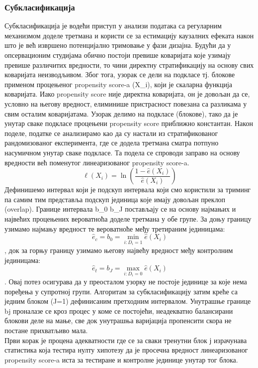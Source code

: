 \documentclass[12pt, a4paper]{article}
\begin{document}
\subsubsection{Субкласификација}
Субкласификација је водећи приступ у анализи података са регуларним механизмом доделе третмана и користи се за естимацију каузалних ефеката након што је већ извршено потенцијално тримовање у фази дизајна. 
Будући да у опсервационим студијама обично постоји превише коваријата које узимају превише различитих вредности, то чини директну стратификацију на основу свих коваријата неизводљивом. Због тога, узорак се дели на подкласе тј. блокове применом процењеног propensity score-a (X_i), који је скаларна функција коваријата. Иако propensity score није директна коваријата, он је довољан да се, условно на његову вредност, елиминише пристрасност повезана са разликама у свим осталим коваријатама.
Узорак  делимо на подкласе (блокове), тако да је унутар сваке подкласе процењени propensity score приближно константан. Након поделе, податке се анализирамо као да су настали из стратификованог рандомизованог експеримента, где се додела третмана сматра потпуно насумичном унутар сваке подкласе. Та подела се спроводи заправо на основу вредности већ поменутог линеаризованог propensity score-a.
$$\ell(X_i) = \ln \left( \frac{1 - \hat{e}(X_i)}{\hat{e}(X_i)} \right)$$
Дефинишемо интервал који је подскуп интервала који смо користили за триминг па самим тим представља подскуп јединица које имају довољан преклоп (overlap).
Границе интервала b_0 \quad {} \quad b_J постављају се на основу најмањих и највећих процењених вероватноћа доделе третмана у обе групе.  За доњу границу узимамо најмању вредност те вероватноће међу третираним јединицама:
$$\hat{e}_c = b_0 = \min_{i: D_i = 1} \hat{e}(X_i)$$
, док за горњу границу узимамо његову највећу вредност међу контролним јединицама:
$$\hat{e}_t = b_J = \max_{i: D_i = 0} \hat{e}(X_i)$$.
Овај потез осигурава да у преосталом узорку не постоје јединице за које нема поређења у супротној групи. Алгоритам за субкласификацију затим креће са једним блоком (J=1) дефинисаним претходним интервалом. Унутрашње границе bj проналазе се кроз процес у коме се постојећи, неадекватно балансирани блокови деле на мање, све док унутрашња варијација пропенсити скора не постане прихватљиво мала.
\\Први корак је процена адекватности где се за сваки тренутни блок ј израчунава статистика која тестира нулту хипотезу да је просечна вредност линеаризованог propensity score-a иста за тестиране и контролне јединице унутар тог блока.
\end{document}
